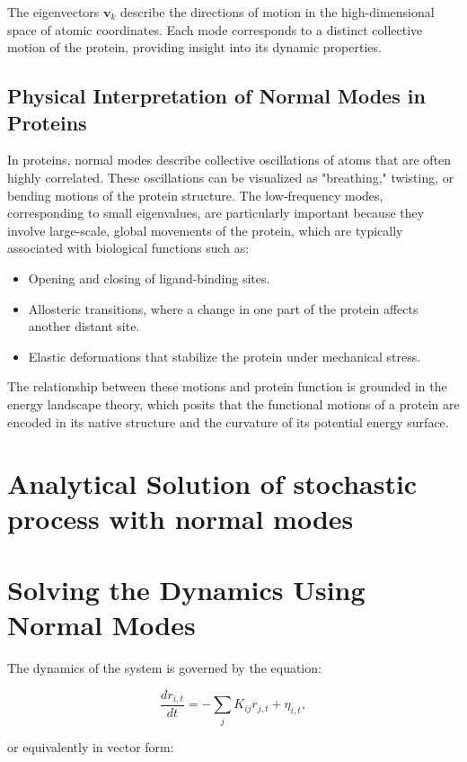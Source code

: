 \documentclass[English, Lau, oneside]{sapthesis}
\begin{document}
The eigenvectors \( \mathbf{v}_k \) describe the directions of motion in the high-dimensional space of atomic coordinates. Each mode corresponds to a distinct collective motion of the protein, providing insight into its dynamic properties.

\subsection{Physical Interpretation of Normal Modes in Proteins}

In proteins, normal modes describe collective oscillations of atoms that are often highly correlated. These oscillations can be visualized as "breathing," twisting, or bending motions of the protein structure. The low-frequency modes, corresponding to small eigenvalues, are particularly important because they involve large-scale, global movements of the protein, which are typically associated with biological functions such as:

\begin{itemize}
    \item Opening and closing of ligand-binding sites.
    \item Allosteric transitions, where a change in one part of the protein affects another distant site.
    \item Elastic deformations that stabilize the protein under mechanical stress.
\end{itemize}

The relationship between these motions and protein function is grounded in the energy landscape theory, which posits that the functional motions of a protein are encoded in its native structure and the curvature of its potential energy surface.
\newpage
\section{Analytical Solution of stochastic process with normal modes}
\section{Solving the Dynamics Using Normal Modes}

The dynamics of the system is governed by the equation:

\begin{equation}
\frac{d r_{i,t}}{dt} = -\sum_j K_{ij} r_{j,t} + \eta_{i,t},
\end{equation}

or equivalently in vector form:
\end{document}
